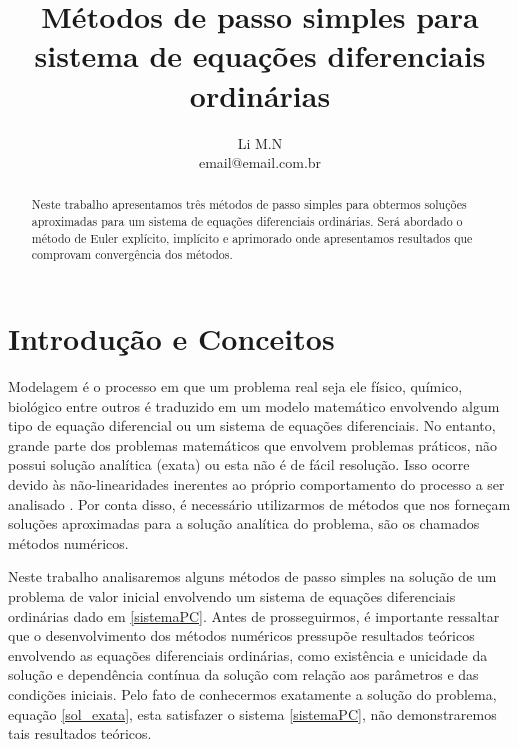 \documentclass[amsmath,amssymb,floatfix]{revtex4}
\begin{document}

\title{Métodos de passo simples para sistema de equações diferenciais ordinárias}

\author{Li M.N \\\small email@email.com.br} 

\begin{abstract}
\baselineskip 11pt
Neste trabalho apresentamos três métodos de passo simples para obtermos soluções aproximadas para um sistema de equações diferenciais ordinárias. Será abordado o método de Euler explícito, implícito e aprimorado onde apresentamos resultados que comprovam convergência dos métodos.
\end{abstract}

\maketitle

\section{Introdução e Conceitos}

Modelagem é o processo em que um problema real seja ele físico, químico, biológico entre outros é traduzido em um modelo matemático envolvendo algum tipo de equação diferencial ou um sistema de equações diferenciais. No entanto, grande parte dos problemas matemáticos que envolvem problemas práticos, não possui solução analítica (exata) ou esta não é de fácil resolução. Isso ocorre devido às não-linearidades inerentes ao próprio comportamento do processo a ser analisado \cite{sebastiao}.
Por conta disso, é necessário utilizarmos de métodos que nos forneçam soluções aproximadas para a solução analítica do problema, são os chamados métodos numéricos.

Neste trabalho analisaremos alguns métodos de passo simples na solução de um problema de valor inicial envolvendo um sistema de equações diferenciais ordinárias dado em \eqref{sistemaPC}. Antes de prosseguirmos, é importante ressaltar que o desenvolvimento dos métodos numéricos pressupõe resultados teóricos envolvendo as equações diferenciais ordinárias, como existência e unicidade da solução e dependência contínua da solução com relação aos parâmetros e das condições iniciais. Pelo fato de conhecermos exatamente a solução do problema, equação \eqref{sol_exata}, esta satisfazer o sistema \eqref{sistemaPC}, não demonstraremos tais resultados teóricos. %
\end{document}
